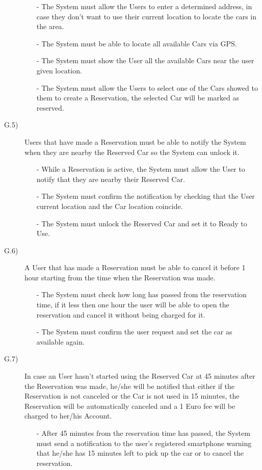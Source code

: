 \documentclass[a4paper]{article}
\begin{document}
\begin{description}
\begin{itemize}
	\item[-]The System must allow the Users to enter a determined address, in case they don't want to use their current location to locate the cars in the area.
	\item[-]The System must be able to locate all available Cars via GPS.
	\item[-]The System must show the User all the available Cars near the user given location.
	\item[-]The System must allow the Users to select one of the Cars showed to them to create a Reservation, the selected Car will be marked as reserved.
\end{itemize}
\item [G.5)]Users that have made a Reservation must be able to notify the System when they are nearby the Reserved Car so the System can unlock it.
\begin{itemize}
	\item[-]While a Reservation is active, the System must allow the User to notify that they are nearby their Reserved Car.
	\item[-]The System must confirm the notification by checking that the User current location and the Car location coincide.
	\item[-]The System must unlock the Reserved Car and set it to Ready to Use.
\end{itemize}
\item [G.6)]A User that has made a Reservation must be able to cancel it before 1 hour starting from the time when the Reservation was made.
\begin{itemize}
	\item[-]The System must check how long has passed from the reservation time, if it less then one hour the user will be able to open the reservation and cancel it without being charged for it.
	\item[-]The System must confirm the user request and set the car as available again.
\end{itemize}
\item [G.7)]In case an User hasn't started using the Reserved Car at 45 minutes after the Reservation was made, he/she will be notified that either if the Reservation is not canceled or the Car is not used in 15 minutes, the Reservation will be automatically canceled and a 1 Euro fee will be charged to her/his Account.
\begin{itemize}
	\item[-]After 45 minutes from the reservation time has passed, the System must send a notification to the user's registered smartphone warning that he/she has 15 minutes left to pick up the car or to cancel the reservation.

\end{itemize}
\end{description}
\end{document}
